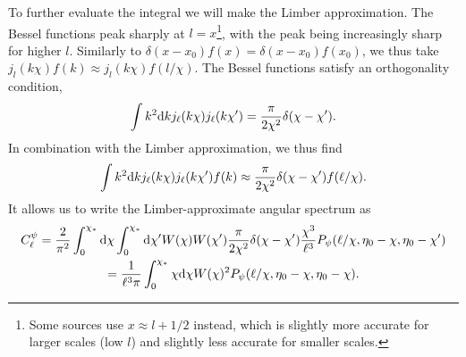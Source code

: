 \documentclass[11pt]{article} %
\DeclareRobustCommand{\d}{\ifmmode\text{d}\else d\fi}
\begin{document}
To further evaluate the integral we will make the Limber approximation. The Bessel functions peak sharply at $l=x$\footnote{Some sources use $x\approx l+1/2$ instead, which is slightly more accurate for larger scales (low $l$) and slightly less accurate for smaller scales.}, with the peak being increasingly sharp for higher $l$. Similarly to $\delta(x-x_0)f(x)=\delta(x-x_0)f(x_0)$, we thus take $j_l(k\chi)f(k)\approx j_l(k\chi)f(l/\chi)$. The Bessel functions satisfy an orthogonality condition,
\begin{equation}
    \int k^2\d k j_\ell(k\chi)j_\ell(k\chi') = \frac{\pi}{2\chi^2}\delta(\chi-\chi').
\end{equation}
In combination with the Limber approximation, we thus find
\begin{equation}
    \int k^2\d k j_\ell(k\chi)j_\ell(k\chi')f(k) \approx \frac{\pi}{2\chi^2}\delta(\chi-\chi')f(\ell/\chi).
\end{equation}
It allows us to write the Limber-approximate angular spectrum as
\begin{gather}
    C^\psi_{\ell} = \frac{2}{\pi^2}\int_0^{\chi_*}\d \chi\int_0^{\chi_*}\d \chi' W(\chi)W(\chi') \frac{\pi}{2\chi^2}\delta(\chi-\chi')\frac{\chi^3}{\ell^3}P_\psi(\ell/\chi,\eta_0 - \chi, \eta_0-\chi')\\
    = \frac{1}{\ell^3\pi}\int_0^{\chi_*}\chi\d \chi W(\chi)^2 P_\psi(\ell/\chi,\eta_0 - \chi, \eta_0-\chi). \label{eq:lpsintermsofpsi}
\end{gather}
\end{document}
